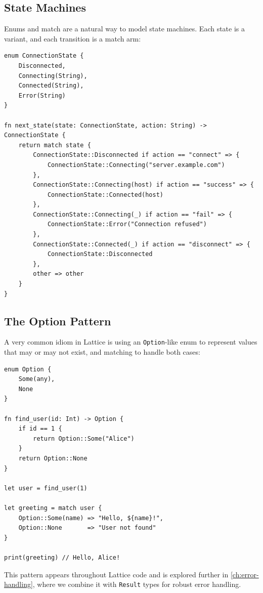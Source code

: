 \subsection{State Machines}\label{sec:state-machines}

Enums and match are a natural way to model state machines. Each state is a variant, and each transition is a match arm:

\begin{lstlisting}[language=Lattice, caption={A state machine with match}]
enum ConnectionState {
    Disconnected,
    Connecting(String),
    Connected(String),
    Error(String)
}

fn next_state(state: ConnectionState, action: String) -> ConnectionState {
    return match state {
        ConnectionState::Disconnected if action == "connect" => {
            ConnectionState::Connecting("server.example.com")
        },
        ConnectionState::Connecting(host) if action == "success" => {
            ConnectionState::Connected(host)
        },
        ConnectionState::Connecting(_) if action == "fail" => {
            ConnectionState::Error("Connection refused")
        },
        ConnectionState::Connected(_) if action == "disconnect" => {
            ConnectionState::Disconnected
        },
        other => other
    }
}
\end{lstlisting}

\subsection{The Option Pattern}\label{sec:option-pattern}

A very common idiom in Lattice is using an \lstinline|Option|-like enum to represent values that may or may not exist, and matching to handle both cases:

\begin{lstlisting}[language=Lattice, caption={The Option pattern}]
enum Option {
    Some(any),
    None
}

fn find_user(id: Int) -> Option {
    if id == 1 {
        return Option::Some("Alice")
    }
    return Option::None
}

let user = find_user(1)

let greeting = match user {
    Option::Some(name) => "Hello, ${name}!",
    Option::None       => "User not found"
}

print(greeting) // Hello, Alice!
\end{lstlisting}

This pattern appears throughout Lattice code and is explored further in \cref{ch:error-handling}, where we combine it with \lstinline|Result| types for robust error handling.

